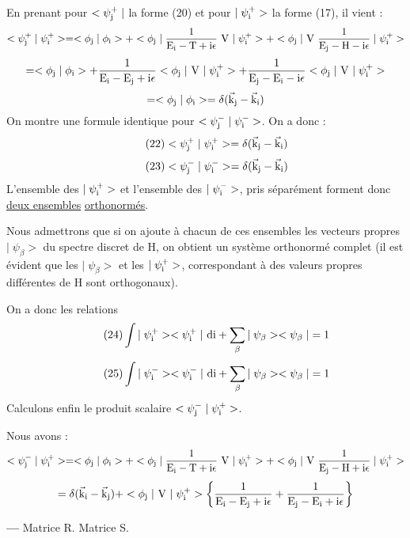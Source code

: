En prenant pour $<\psi_{\text{j}}^+\;|$ la forme (20) et pour $|\;\psi_{\text{i}}^+>$ la forme
(17), il vient :
\[
<\psi_{\text{j}}^+\;|\;\psi_{\text{i}}^+>=<\phi_{\text{j}}\;|\;\phi_{\text{i}}>+
<\phi_{\text{j}}\;|\;\frac{1}{\text{E}_{\text{i}}-\text{T}+\text{i}\epsilon}\text{ V }|\;\psi_{\text{i}}^+>+
<\phi_{\text{j}}\;|\text{ V }\frac{1}{\text{E}_{\text{j}}-\text{H}-\text{i}\epsilon}\;|\;\psi_{\text{i}}^+>
\]
\[
=<\phi_{\text{j}}\;|\;\phi_{\text{i}}>+
\frac{1}{\text{E}_{\text{i}}-\text{E}_{\text{j}}+\text{i}\epsilon}<\phi_{\text{j}}\;|\text{ V }|\;\psi_{\text{i}}^+>+
\frac{1}{\text{E}_{\text{j}}-\text{E}_{\text{i}}-\text{i}\epsilon}<\phi_{\text{j}}\;|\text{ V }|\;\psi_{\text{i}}^+>
\]
\[
=<\phi_{\text{j}}\;|\;\phi_{\text{i}}>=\delta({\vec{\text{k}}_{\text{j}}}-{\vec{\text{k}}_{\text{i}}})
\]
On montre une formule identique pour $<\psi_{\text{j}}^-\;|\;\psi_{\text{i}}^->$. On a donc :
\[
\tag{22}<\psi_{\text{j}}^+\;|\;\psi_{\text{i}}^+>=\delta({\vec{\text{k}}_{\text{j}}}-{\vec{\text{k}}_{\text{i}}})
\]
\[
\tag{23}<\psi_{\text{j}}^-\;|\;\psi_{\text{i}}^->=\delta({\vec{\text{k}}_{\text{j}}}-{\vec{\text{k}}_{\text{i}}})
\]
L'ensemble des $|\;\psi_{\text{i}}^+>$ et l'ensemble des $|\;\psi_{\text{i}}^->$, pris séparément
forment donc \ul{deux ensembles} \ul{orthonormés}.

Nous admettrons que si on ajoute à chacun de ces ensembles
les vecteurs propres $|\;\psi_\beta>$ du spectre discret de H, on obtient un système orthonormé
complet (il est évident que les $|\;\psi_\beta>$ et les $|\;\psi_{\text{i}}^+>$, correspondant à des valeurs propres
différentes de H sont orthogonaux).

On a donc les relations
\[
\tag{24}\int|\;\psi_{\text{i}}^+><\psi_{\text{i}}^+\;|\text{ di}+\sum_\beta|\;\psi_\beta><\psi_\beta\;|=1
\]
\[
\tag{25}\int|\;\psi_{\text{i}}^-><\psi_{\text{i}}^-\;|\text{ di}+\sum_\beta|\;\psi_\beta><\psi_\beta\;|=1
\]
Calculons enfin le produit scalaire $<\psi_{\text{j}}^-\;|\;\psi_{\text{i}}^+>$.

Nous avons :
\[
<\psi_{\text{j}}^-\;|\;\psi_{\text{i}}^+>=<\phi_{\text{j}}\;|\;\phi_{\text{i}}>+
<\phi_{\text{j}}\;|\;\frac{1}{\text{E}_{\text{i}}-\text{T}+\text{i}\epsilon}\text{ V }|\;\psi_{\text{i}}^+>+
<\phi_{\text{j}}\;|\text{ V }\frac{1}{\text{E}_{\text{j}}-\text{H}+\text{i}\epsilon}\;|\;\psi_{\text{i}}^+>
\]
\[
=\delta({\vec{\text{k}}_{\text{i}}}-{\vec{\text{k}}_{\text{j}}})+<\phi_{\text{j}}\;|\text{ V }|\;\psi_{\text{i}}^+>
\left\{
\frac{1}{\text{E}_{\text{i}}-\text{E}_{\text{j}}+\text{i}\epsilon}+\frac{1}{\text{E}_{\text{j}}-\text{E}_{\text{i}}+\text{i}\epsilon}
\right\}
\]

{\bf—} Matrice R. Matrice S.

